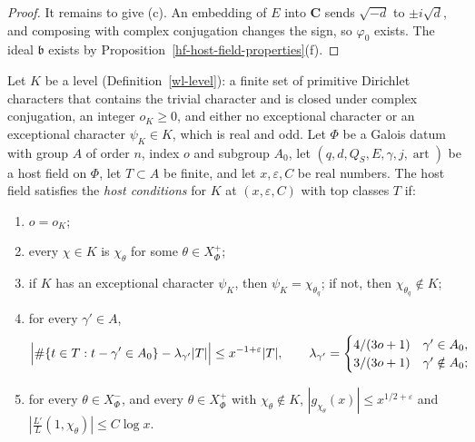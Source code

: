 \begin{proof}
It remains to give (c). An embedding of $E$ into $\mathbf C$ sends $\sqrt{-d}$ to $\pm i\sqrt d$,
and composing with complex conjugation changes the sign, so $\varphi_0$ exists. The ideal
$\mathfrak b$ exists by Proposition~\ref{hf-host-field-properties}(f).
\end{proof}

\begin{definition}\label{hf-host-conditions}
Let $K$ be a level (Definition~\ref{wl-level}): a finite set of primitive Dirichlet characters that
contains the trivial character and is closed under complex conjugation, an integer $o_K\geq0$, and
either no exceptional character or an exceptional character $\psi_K\in K$, which is real and odd. Let $\Phi$ be a Galois datum with group $A$ of order $n$, index $o$ and
subgroup $A_0$, let $(q,d,Q_S,E,\gamma,j,\operatorname{art})$ be a host field on $\Phi$, let
$T\subset A$ be finite, and let $x,\varepsilon,C$ be real numbers. The host field satisfies the
\emph{host conditions} for $K$ at $(x,\varepsilon,C)$ with top classes $T$ if:
\begin{enumerate}
\item $o=o_K$;
\item every $\chi\in K$ is $\chi_\theta$ for some $\theta\in X^+_\Phi$;
\item if $K$ has an exceptional character $\psi_K$, then $\psi_K=\chi_{\theta_q}$; if not, then
  $\chi_{\theta_q}\notin K$;
\item for every $\gamma'\in A$,
  \[
   \Bigl|\#\{t\in T:t-\gamma'\in A_0\}-\lambda_{\gamma'}|T|\Bigr|\leq x^{-1+\varepsilon}|T|,
   \qquad\lambda_{\gamma'}=\begin{cases}4/(3o+1)&\gamma'\in A_0,\\3/(3o+1)&\gamma'\notin A_0;\end{cases}
  \]
\item for every $\theta\in X^-_\Phi$, and every $\theta\in X^+_\Phi$ with $\chi_\theta\notin K$,
  $|g_{\chi_\theta}(x)|\leq x^{1/2+\varepsilon}$ and
  $\left|\frac{L'}{L}(1,\chi_\theta)\right|\leq C\log x$.
\end{enumerate}
\end{definition}

